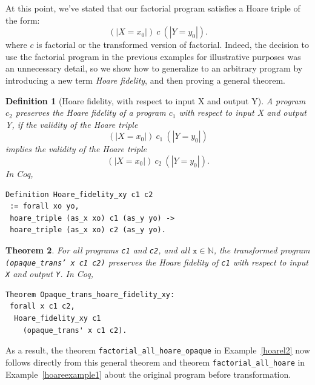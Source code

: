 \documentclass[compsoc,conference,a4paper,10pt,times]{IEEEtran}
\newtheorem{theorem}{Theorem}[section]
\newtheorem{defin}[theorem]{Definition}
\begin{document}
At this point, we've stated that our factorial program satisfies a Hoare triple of the form:
\[ (| X = x_0 |)\ c\ (| Y = y_0 |). \]
%
where $c$ is factorial or the transformed version of factorial.  Indeed, the decision to use the factorial program in the previous examples for illustrative purposes was an unnecessary detail, so we  show how to generalize to an arbitrary program by introducing a new term \emph{Hoare fidelity}, and then proving a general theorem.

\begin{defin}[Hoare fidelity, with respect to input X and output Y]
A program $c_2$ preserves the Hoare fidelity of a program $c_1$ with respect to input X and output Y, if the validity of the Hoare triple
\[
(| X = x_0 |)\ c_1\ (| Y = y_0 |)
\]
implies the validity of the Hoare triple
\[
(| X = x_0 |)\ c_2\ (| Y = y_0 |).
\]
In Coq,
\begin{verbatim}
Definition Hoare_fidelity_xy c1 c2 
 := forall xo yo,
 hoare_triple (as_x xo) c1 (as_y yo) -> 
 hoare_triple (as_x xo) c2 (as_y yo).\end{verbatim}
\end{defin}
%
%
\begin{theorem}\label{hoare_xy_main}
For all programs \texttt{c1} and \texttt{c2}, and all $\mathtt{x} \in \mathbb{N}$, the transformed program \texttt{(opaque\_trans' x c1 c2)} preserves the Hoare fidelity of \texttt{c1} with respect to input \texttt{X} and output \texttt{Y}.
In Coq, \begin{verbatim}
Theorem Opaque_trans_hoare_fidelity_xy: 
 forall x c1 c2,
  Hoare_fidelity_xy c1 
    (opaque_trans' x c1 c2).
\end{verbatim}
\end{theorem}
As a result, the theorem \texttt{factorial\_\-all\_\-hoare\_\-opaque} in Example~\ref{hoarel2} now follows directly from this general theorem and theorem \texttt{factorial\_all\_hoare} in Example~\ref{hoareexample1} about the original program before transformation.
\end{document}
